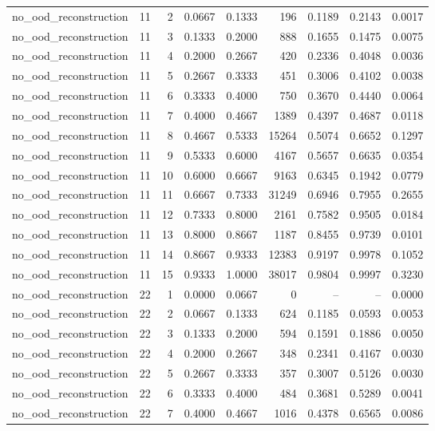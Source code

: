 \begin{tabular}{lrrrrrrrr}
no\_ood\_reconstruction & 11 & 2 & 0.0667 & 0.1333 & 196 & 0.1189 & 0.2143 & 0.0017 \\
no\_ood\_reconstruction & 11 & 3 & 0.1333 & 0.2000 & 888 & 0.1655 & 0.1475 & 0.0075 \\
no\_ood\_reconstruction & 11 & 4 & 0.2000 & 0.2667 & 420 & 0.2336 & 0.4048 & 0.0036 \\
no\_ood\_reconstruction & 11 & 5 & 0.2667 & 0.3333 & 451 & 0.3006 & 0.4102 & 0.0038 \\
no\_ood\_reconstruction & 11 & 6 & 0.3333 & 0.4000 & 750 & 0.3670 & 0.4440 & 0.0064 \\
no\_ood\_reconstruction & 11 & 7 & 0.4000 & 0.4667 & 1389 & 0.4397 & 0.4687 & 0.0118 \\
no\_ood\_reconstruction & 11 & 8 & 0.4667 & 0.5333 & 15264 & 0.5074 & 0.6652 & 0.1297 \\
no\_ood\_reconstruction & 11 & 9 & 0.5333 & 0.6000 & 4167 & 0.5657 & 0.6635 & 0.0354 \\
no\_ood\_reconstruction & 11 & 10 & 0.6000 & 0.6667 & 9163 & 0.6345 & 0.1942 & 0.0779 \\
no\_ood\_reconstruction & 11 & 11 & 0.6667 & 0.7333 & 31249 & 0.6946 & 0.7955 & 0.2655 \\
no\_ood\_reconstruction & 11 & 12 & 0.7333 & 0.8000 & 2161 & 0.7582 & 0.9505 & 0.0184 \\
no\_ood\_reconstruction & 11 & 13 & 0.8000 & 0.8667 & 1187 & 0.8455 & 0.9739 & 0.0101 \\
no\_ood\_reconstruction & 11 & 14 & 0.8667 & 0.9333 & 12383 & 0.9197 & 0.9978 & 0.1052 \\
no\_ood\_reconstruction & 11 & 15 & 0.9333 & 1.0000 & 38017 & 0.9804 & 0.9997 & 0.3230 \\
no\_ood\_reconstruction & 22 & 1 & 0.0000 & 0.0667 & 0 & -- & -- & 0.0000 \\
no\_ood\_reconstruction & 22 & 2 & 0.0667 & 0.1333 & 624 & 0.1185 & 0.0593 & 0.0053 \\
no\_ood\_reconstruction & 22 & 3 & 0.1333 & 0.2000 & 594 & 0.1591 & 0.1886 & 0.0050 \\
no\_ood\_reconstruction & 22 & 4 & 0.2000 & 0.2667 & 348 & 0.2341 & 0.4167 & 0.0030 \\
no\_ood\_reconstruction & 22 & 5 & 0.2667 & 0.3333 & 357 & 0.3007 & 0.5126 & 0.0030 \\
no\_ood\_reconstruction & 22 & 6 & 0.3333 & 0.4000 & 484 & 0.3681 & 0.5289 & 0.0041 \\
no\_ood\_reconstruction & 22 & 7 & 0.4000 & 0.4667 & 1016 & 0.4378 & 0.6565 & 0.0086 \\

\end{tabular}
